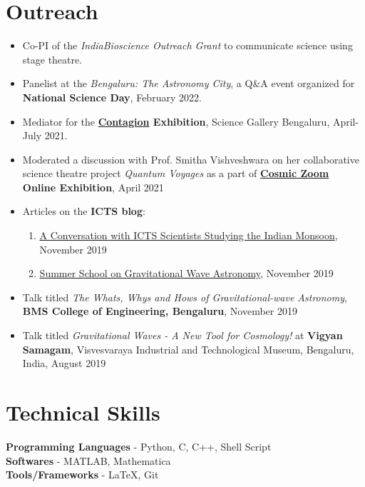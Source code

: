 \documentclass[margin, centered]{res}
\begin{document}
\begin{resume}
\begin{itemize}[leftmargin=*]
\end{itemize}
\section{Outreach}
\begin{itemize}[leftmargin=*]
	\item Co-PI of the \textit{IndiaBioscience Outreach Grant} to communicate science using stage theatre.
	\item Panelist at the \textit{Bengaluru: The Astronomy City}, a Q\&A event organized for \textbf{National Science Day}, February 2022.
	\item Mediator for the \textbf{\href{https://bengaluru.sciencegallery.com/contagion-archive}{Contagion} Exhibition}, Science Gallery Bengaluru, April-July 2021.
	\item Moderated a discussion with Prof. Smitha Vishveshwara on her collaborative science theatre project \textit{Quantum Voyages} as a part of \textbf{\href{https://cosmic-zoom.in/}{Cosmic Zoom} Online Exhibition}, April 2021
	\item Articles on the \textbf{ICTS blog}:
	\begin{enumerate}
		\item \href{https://blog.icts.res.in/blog/conversation-icts-scientists-studying-indian-monsoon}{A Conversation with ICTS Scientists Studying the Indian Monsoon}, November 2019
		\item \href{https://blog.icts.res.in/blog/summer-school-gravitational-wave-astronomy}{Summer School on Gravitational Wave Astronomy}, November 2019
	\end{enumerate}	
	\item Talk titled \textit{The Whats, Whys and Hows of Gravitational-wave Astronomy}, \textbf{BMS College of Engineering, Bengaluru}, November 2019
	\item Talk titled \textit{Gravitational Waves - A New Tool for Cosmology!} at \textbf{Vigyan Samagam}, Visvesvaraya Industrial and Technological Museum, Bengaluru, India, August 2019

\end{itemize}




\section{Technical \hspace{2mm} Skills}
\textbf{Programming Languages} - Python, C, C++, Shell Script\\
\textbf{Softwares} - MATLAB, Mathematica \\
\textbf{Tools/Frameworks} - \LaTeX, Git




\end{resume}
\end{document}
